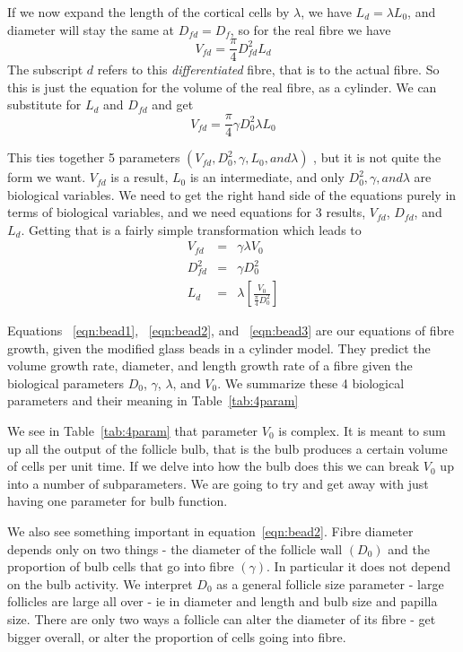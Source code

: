 \documentclass[titlepage]{article}  %
\begin{document}
If we now expand the length of the cortical cells by $\lambda$, we have $L_{d} = \lambda L_{0}$, and diameter will stay the same at $D_{fd} = D_{f}$, so for the real fibre we have 
\begin{displaymath}
V_{fd} =  \frac{\pi}{4} D_{fd}^{2} L_{d}
\end{displaymath}
 The subscript $d$ refers to this {\em differentiated} fibre, that is to the actual fibre. So this is just the equation for the volume of the real fibre, as a cylinder. We can substitute for $L_{d}$ and $D_{fd}$ and get
\begin{displaymath}
V_{fd} =  \frac{\pi}{4} \gamma D_{0}^{2} \lambda L_{0} 
\end{displaymath}

This ties together 5 parameters $(V_{fd}, D_{0}^{2}, \gamma, L_{0}, and \lambda)$ , but it is not quite the form we want. $V_{fd}$ is a result, $L_{0}$ is an intermediate, and only $D_{0}^{2}, \gamma, and \lambda$ are biological variables. We need to get the right hand side of the equations  purely in terms of biological variables, and we need equations for 3 results, $V_{fd}$, $D_{fd}$, and $L_{d}$. Getting that is a fairly simple transformation which leads to
\begin{eqnarray}
\label{eqn:bead1}
V_{fd}  & = & \gamma \lambda V_{0} \\
\label{eqn:bead2}
D_{fd}^{2} & = & \gamma D_{0}^{2} \\
\label{eqn:bead3}
L_{d}  & = & \lambda \left [ \frac{V_{0}}{\frac{\pi}{4} D_{0}^{2}} \right ]
\end{eqnarray}

Equations ~\ref{eqn:bead1}, ~\ref{eqn:bead2}, and ~\ref{eqn:bead3} are our equations of fibre growth, given the modified  glass beads in a cylinder model. They predict the volume growth rate, diameter, and length growth rate of a fibre given the biological parameters $D_{0}$, $\gamma$, $\lambda$, and $V_{0}$. We summarize these 4 biological parameters and their meaning in Table~\ref{tab:4param}

We see in Table~\ref{tab:4param} that parameter $V_{0}$ is complex. It is meant to sum up all the output of the follicle bulb, that is the bulb produces a certain volume of cells per unit time. If we delve into how the bulb does this we can break $V_{0}$ up into a number of subparameters. We are going to try and get away with just having one parameter for bulb function.

We also see something important in equation~\ref{eqn:bead2}. Fibre diameter depends only on two things - the diameter of the follicle wall $(D_{0})$ and the proportion of bulb cells that go into fibre $(\gamma)$. In particular it does not depend on the bulb activity. We interpret $D_{0}$ as a general follicle size parameter - large follicles are large all over - ie in diameter and length and bulb size and papilla size. There are only two ways a follicle can alter the diameter of its fibre - get bigger overall, or alter the proportion of cells going into fibre. 
\end{document}
